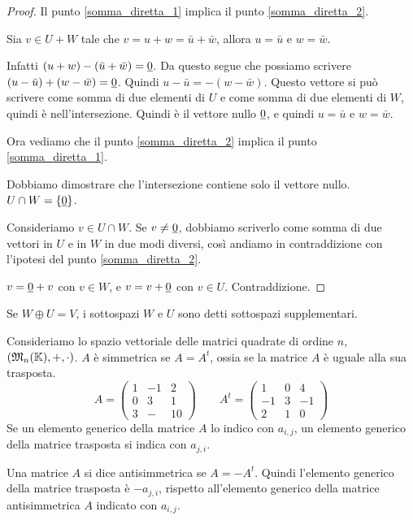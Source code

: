 \begin{proof}
Il punto \ref{somma_diretta_1} implica il punto \ref{somma_diretta_2}.

Sia $v \in U + W$ tale che $v = u + w = \bar{u} + \bar{w}$, allora $u = \bar{u}$ e $w = \bar{w}$.

Infatti $(u + w) - (\bar{u} + \bar{w}) = \underline{0}$. Da questo segue che possiamo scrivere $(u - \bar{u}) + (w - \bar{w}) = \underline{0}$. Quindi $u - \bar{u} = - (w - \bar{w})$. Questo vettore si pu\`o scrivere come somma di due elementi di $U$ e come somma di due elementi di $W$, quindi \`e nell'intersezione. Quindi \`e il vettore nullo $\underline{0}$, e quindi $u = \bar{u}$ e $w = \bar{w}$.

Ora vediamo che il punto \ref{somma_diretta_2} implica il punto \ref{somma_diretta_1}.

Dobbiamo dimostrare che l'intersezione contiene solo il vettore nullo. $U \cap W = \{ \underline{0} \}$.

Consideriamo $v \in U \cap W$. Se $v \neq \underline{0}$, dobbiamo scriverlo come somma di due vettori in $U$ e in $W$ in due modi diversi, cos\`i andiamo in contraddizione con l'ipotesi del punto \ref{somma_diretta_2}.

$v = \underline{0} + v$ con $v \in W$, e $v = v + \underline{0}$ con $v \in U$. Contraddizione.
\end{proof}


Se $W \oplus U = V$, i sottospazi $W$ e $U$ sono detti sottospazi supplementari.

Consideriamo lo spazio vettoriale delle matrici quadrate di ordine $n$, $(\mathfrak{M}_n (\mathbb{K}), +, \cdot)$. $A$ \`e simmetrica se $A = A^t$, ossia se la matrice $A$ \`e uguale alla sua trasposta.
\[
A =
\begin{pmatrix}
1 & -1 & 2 \\
0 & 3 & 1 \\
3 & - & 10
\end{pmatrix}
\qquad
A^t =
\begin{pmatrix}
1 & 0 & 4 \\
-1 & 3 & -1 \\
2 & 1 & 0
\end{pmatrix}
\]
Se un elemento generico della matrice $A$ lo indico con $a_{i,j}$, un elemento generico della matrice trasposta si indica con $a_{j,i}$.

Una matrice $A$ si dice antisimmetrica se $A = -A^t$. Quindi l'elemento generico della matrice trasposta \`e $-a_{j,i}$, rispetto all'elemento generico della matrice antisimmetrica $A$ indicato con $a_{i,j}$.

